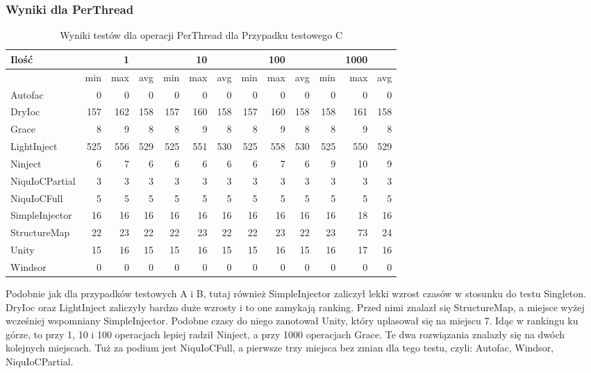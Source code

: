 \documentclass[12pt]{article}
\begin{document}
\subsubsection{Wyniki dla PerThread}
\begin{table}[H]
\captionsetup{belowskip=0pt,aboveskip=0pt}
\begin{center}
\begin{small}
	\begin{tabular}{ | l | r r r | r r r | r r r | r r r | }
    		\hline
Ilość & & 1 & & & 10 & & & 100 & & & 1000 & \\ \hline
 & min & max & avg & min & max & avg & min & max & avg & min & max & avg \\ \hline
Autofac & 0 & 0 & 0 & 0 & 0 & 0 & 0 & 0 & 0 & 0 & 0 & 0 \\ \hline
DryIoc & 157 & 162 & 158 & 157 & 160 & 158 & 157 & 160 & 158 & 158 & 161 & 158 \\ \hline
Grace & 8 & 9 & 8 & 8 & 9 & 8 & 8 & 9 & 8 & 8 & 9 & 8 \\ \hline
LightInject & 525 & 556 & 529 & 525 & 551 & 530 & 525 & 558 & 530 & 525 & 550 & 529 \\ \hline
Ninject & 6 & 7 & 6 & 6 & 6 & 6 & 6 & 7 & 6 & 9 & 10 & 9 \\ \hline
NiquIoCPartial & 3 & 3 & 3 & 3 & 3 & 3 & 3 & 3 & 3 & 3 & 3 & 3 \\ \hline
NiquIoCFull & 5 & 5 & 5 & 5 & 5 & 5 & 5 & 5 & 5 & 5 & 5 & 5 \\ \hline
SimpleInjector & 16 & 16 & 16 & 16 & 16 & 16 & 16 & 16 & 16 & 16 & 18 & 16 \\ \hline
StructureMap & 22 & 23 & 22 & 22 & 23 & 22 & 22 & 23 & 22 & 23 & 73 & 24 \\ \hline
Unity & 15 & 16 & 15 & 15 & 16 & 15 & 15 & 16 & 15 & 16 & 17 & 16 \\ \hline
Windsor & 0 & 0 & 0 & 0 & 0 & 0 & 0 & 0 & 0 & 0 & 0 & 0 \\ \hline
  	\end{tabular}
\end{small}
\end{center}
\caption{Wyniki testów dla operacji PerThread dla Przypadku testowego C}
\label{TestCaseC_PerThread}
\end{table}
Podobnie jak dla przypadków testowych A i B, tutaj również SimpleInjector zaliczył lekki wzrost czasów w stosunku do testu Singleton. DryIoc oraz LightInject zaliczyły bardzo duże wzrosty i to one zamykają ranking. Przed nimi znalazł się StructureMap, a miejsce wyżej wcześniej wspomniany SimpleInjector. Podobne czasy do niego zanotował Unity, który uplasował się na miejscu 7. Idąc w rankingu ku górze, to przy 1, 10 i 100 operacjach lepiej radził Ninject, a przy 1000 operacjach Grace. Te dwa rozwiązania znalazły się na dwóch kolejnych miejscach. Tuż za podium jest NiquIoCFull, a pierwsze trzy miejsca bez zmian dla tego testu, czyli: Autofac, Windsor, NiquIoCPartial.
\end{document}
